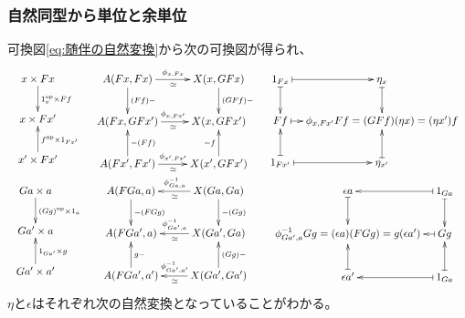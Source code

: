 {\subsubsection{自然同型から単位と余単位}
\label{s3:自然同型から単位と余単位} %
	可換図\eqref{eq:随伴の自然変換}から次の可換図が得られ、
	\begin{equation*}\begin{array}{ccc}
		\xymatrix{
			x\times Fx \ar[d]^{1_x^\opp\times Ff} \\ x\times Fx' \\ 
			x'\times Fx' \ar[u]_{f^\opp\times 1_{Fx'}}
		} & \xymatrix{
			A(Fx,Fx) \ar[r]^{\phi_{x,Fx}}_\simeq \ar[d]^{(Ff)-} 
			& X(x,GFx) \ar[d]^{(GFf)-} \\
			A(Fx,GFx') \ar[r]^{\phi_{x,Fx'}}_\simeq & X(x,GFx') \\
			A(Fx',Fx') \ar[r]^{\phi_{x',Fx'}}_\simeq \ar[u]_{-(Ff)} 
			& X(x',GFx') \ar[u]^{-f} \\
		} & \xymatrix@C=2ex{
			1_{Fx} \ar@{|->}[r] \ar@{|->}[d] & \eta_x \ar@{|->}[d] \\
			Ff \ar@{|->}[r] & \phi_{x,Fx'}Ff = (GFf)(\eta x) = (\eta x')f \\
			1_{Fx'} \ar@{|->}[r] \ar@{|->}[u] & \eta_{x'} \ar@{|->}[u] \\
		} \\
		\xymatrix{
			Ga\times a \ar[d]^{(Gg)^\opp\times 1_a} \\ Ga'\times a \\
			Ga'\times a' \ar[u]_{1_{Ga'}\times g}
		} & \xymatrix{
			A(FGa,a) \ar@{<-}[r]^{\phi_{Ga,a}^{-1}}_\simeq \ar[d]^{-(FGg)} 
			& X(Ga,Ga) \ar[d]^{-(Gg)} \\
			A(FGa',a) \ar@{<-}[r]^{\phi_{Ga',a}^{-1}}_\simeq & X(Ga',Ga) \\
			A(FGa',a') \ar@{<-}[r]^{\phi_{Ga',a'}^{-1}}_\simeq \ar[u]_{g-} 
			& X(Ga',Ga') \ar[u]_{(Gg)-} \\
		} & \xymatrix@C=2ex{
			\epsilon a \ar@{<-|}[r] \ar@{|->}[d] & 1_{Ga} \ar@{|->}[d] \\
			\phi_{Ga',a}^{-1}Gg = (\epsilon a)(FGg) = g(\epsilon a') \ar@{<-|}[r]
			& Gg \\
			\epsilon a' \ar@{<-|}[r] \ar@{|->}[u] & 1_{Ga} \ar@{|->}[u] \\
		} \\
	\end{array}\end{equation*}
	$\eta$と$\epsilon$はそれぞれ次の自然変換となっていることがわかる。
	\begin{equation}\label{eq:単位と余単位の自然変換}\begin{split}

\end{split}
\end{equation}}
